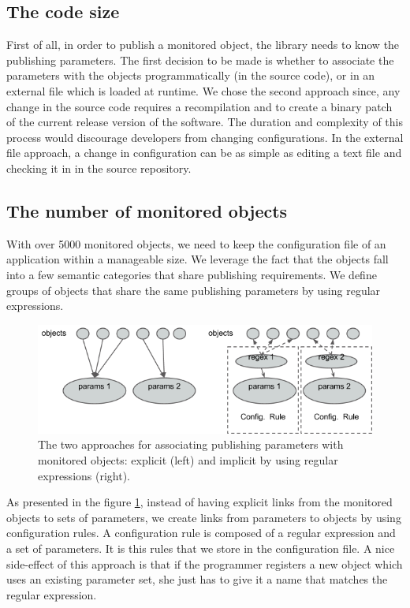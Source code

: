 \subsection*{The code size}

First of all, in order to publish a monitored object, the library needs to know the publishing parameters. The first decision to be made is whether to associate the parameters with the objects programmatically (in the source code), or in an external file which is loaded at runtime. We chose the second approach since, any change in the source code requires a recompilation and to create a binary patch of the current release version of the software. The duration and complexity of this process would discourage developers from changing configurations. In the external file approach, a change in configuration can be as simple as editing a text file and checking it in in the source repository.

\subsection*{The number of monitored objects}

With over 5000 monitored objects, we need to keep the configuration file of an application within a manageable size. We leverage the fact that the objects fall into a few semantic categories that share publishing requirements. We define groups of objects that share the same publishing parameters by using regular expressions. 

\begin{figure}[ht]
\centering
\includegraphics[scale=0.6]{Images/oks_regex.png}
\caption[Publishing parameters association.]{The two approaches for associating publishing parameters with monitored objects: explicit (left) and implicit by using regular expressions (right).}
\label{fig:oks_regex}
\end{figure}

As presented in the figure \ref{fig:oks_regex}, instead of having explicit links from the monitored objects to sets of parameters, we create links from parameters to objects by using configuration rules. A configuration rule is composed of a regular expression and a set of parameters. It is this rules that we store in the configuration file. A nice side-effect of this approach is that if the programmer registers a new object which uses an existing parameter set, she just has to give it a name that matches the regular expression.

